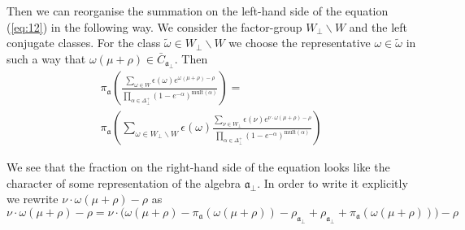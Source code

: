 \documentclass[a4paper,12pt]{article}
\theoremstyle{definition} \newtheorem{Def}{Definition}
\begin{document}
Then we can reorganise the summation on the left-hand side of the equation (\ref{eq:12}) in the following way.
We consider the factor-group $W_{\bot}\backslash W$ and the left conjugate classes. For the class $\tilde{\omega}\in W_{\bot}\backslash W$ we choose the representative $\omega \in \tilde{\omega}$ in such a way that $\omega(\mu+\rho)\in \bar{C}_{\mathfrak{a}_{\bot}}$. Then
\begin{multline}
  \label{eq:13}
 \pi_{\mathfrak{a}}\left(\frac{\sum_{\omega\in W} \epsilon(\omega) e^{\omega(\mu+\rho)-\rho}}{\prod_{\alpha\in\Delta^{+}_{\bot}}(1-e^{-\alpha})^{\mathrm{mult}(\alpha)}}\right) = \\
 \pi_{\mathfrak{a}}\left(\sum_{\omega\in W_{\bot}\backslash W} \epsilon(\omega) \frac{\sum_{\nu\in W_{\bot}}\epsilon(\nu) e^{\nu \cdot \omega(\mu+\rho)-\rho}}{\prod_{\alpha\in\Delta^{+}_{\bot}}(1-e^{-\alpha})^{\mathrm{mult}(\alpha)}}\right) 
\end{multline}

We see that the fraction on the right-hand side of the equation looks like the character of some representation of the algebra $\mathfrak{a}_{\bot}$. 
In order to write it explicitly we rewrite $\nu\cdot\omega(\mu+\rho)-\rho$ as
\begin{equation}
  \label{eq:30}
  \nu\cdot\omega(\mu+\rho)-\rho=\nu\cdot \bigl(\omega(\mu+\rho)-\pi_{\mathfrak{a}}(\omega(\mu+\rho))-\rho_{\mathfrak{a}_{\bot}}+\rho_{\mathfrak{a}_{\bot}}+\pi_{\mathfrak{a}}(\omega(\mu+\rho))\bigr)-\rho
\end{equation}
\end{document}
